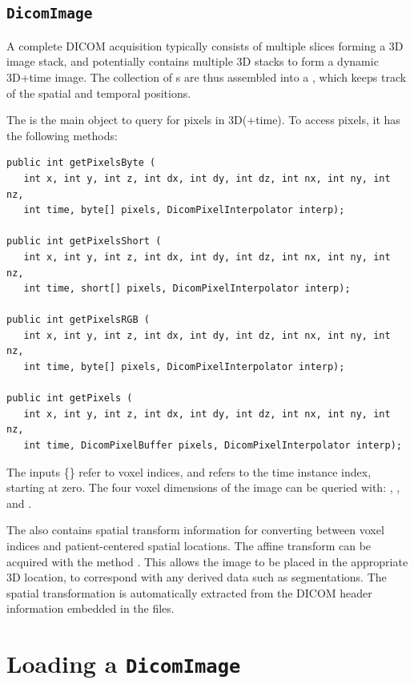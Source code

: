 \subsection{\texttt{DicomImage}}

A complete DICOM acquisition typically consists of multiple slices forming a 3D image stack,
and potentially contains multiple 3D stacks to form a dynamic 3D+time image.  The collection
of s are thus assembled into a , 
which keeps track of the spatial and temporal positions.

The  is the main object to query for pixels in 3D(+time).  To access pixels,
it has the following methods:
\begin{lstlisting}[]
public int getPixelsByte (
   int x, int y, int z, int dx, int dy, int dz, int nx, int ny, int nz, 
   int time, byte[] pixels, DicomPixelInterpolator interp);

public int getPixelsShort (
   int x, int y, int z, int dx, int dy, int dz, int nx, int ny, int nz, 
   int time, short[] pixels, DicomPixelInterpolator interp);

public int getPixelsRGB (
   int x, int y, int z, int dx, int dy, int dz, int nx, int ny, int nz, 
   int time, byte[] pixels, DicomPixelInterpolator interp);

public int getPixels (
   int x, int y, int z, int dx, int dy, int dz, int nx, int ny, int nz, 
   int time, DicomPixelBuffer pixels, DicomPixelInterpolator interp);
\end{lstlisting}
The inputs \{\} refer to voxel indices, and  refers to the time instance index, starting at zero.  The four voxel dimensions of the image can be queried with:  , , and .

The  also contains spatial transform information for converting between voxel indices and patient-centered spatial locations.  The affine transform can be acquired with the method .  This allows the image to be placed in the appropriate 3D location, to correspond with any derived data such as segmentations.  The spatial transformation is automatically extracted from the DICOM header information embedded in the files.

\section{Loading a \texttt{DicomImage} \label{sec:dicom:loading}}

